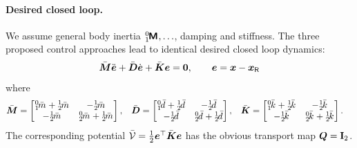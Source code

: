 
\paragraph{Desired closed loop.}
We assume general body inertia $\bodyInertiaMat{0}{1},\ldots$, damping and stiffness.
The three proposed control approaches lead to identical desired closed loop dynamics:
\begin{align}\label{eq:TwoMassSpringClosedLoop}
 \sysInertiaMatC \sysCoordEdd + \sysDissMatC \sysCoordEd + \sysStiffMatC \sysCoordE = \tuple{0},
\qquad
 \sysCoordE = \sysCoord - \sysCoordR
\end{align}
where
\begin{align}
 \sysInertiaMatC &= \begin{bmatrix} \bodyMassC{0}{1} + \bodyMassC{1}{2} & -\bodyMassC{1}{2} \\ -\bodyMassC{1}{2} & \bodyMassC{0}{2}+\bodyMassC{1}{2} \end{bmatrix},&
 \sysDissMatC &= \begin{bmatrix} \bodyDampingC{0}{1} + \bodyDampingC{1}{2} & -\bodyDampingC{1}{2} \\ -\bodyDampingC{1}{2} & \bodyDampingC{0}{2}+\bodyDampingC{1}{2} \end{bmatrix},&
 \sysStiffMatC &= \begin{bmatrix} \bodyStiffnessC{0}{1} + \bodyStiffnessC{1}{2} & -\bodyStiffnessC{1}{2} \\ -\bodyStiffnessC{1}{2} & \bodyStiffnessC{0}{2}+\bodyStiffnessC{1}{2} \end{bmatrix}.
\end{align}
The corresponding potential $\potentialEnergyC = \tfrac{1}{2} \sysCoordE^\top \sysStiffMatC \sysCoordE$ has the obvious transport map $\sysTransportMap = \idMat[2]$.


